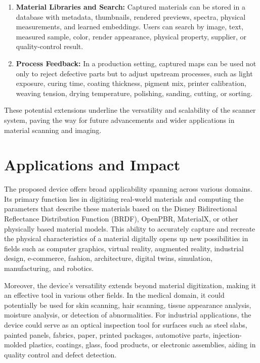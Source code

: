 \documentclass[11pt, twoside, listof=totocnumbered, bibliography=totocnumbered]{scrartcl}
\begin{document}
\begin{enumerate}
		\item \textbf{Material Libraries and Search:} Captured materials can be stored in a database with metadata, thumbnails, rendered previews, spectra, physical measurements, and learned embeddings. Users can search by image, text, measured sample, color, render appearance, physical property, supplier, or quality-control result.
		
		\item \textbf{Process Feedback:} In a production setting, captured maps can be used not only to reject defective parts but to adjust upstream processes, such as light exposure, curing time, coating thickness, pigment mix, printer calibration, weaving tension, drying temperature, polishing, sanding, cutting, or sorting.
	\end{enumerate}
	
	These potential extensions underline the versatility and scalability of the scanner system, paving the way for future advancements and wider applications in material scanning and imaging.
	
	\section{Applications and Impact}
	The proposed device offers broad applicability spanning across various domains. Its primary function lies in digitizing real-world materials and computing the parameters that describe these materials based on the Disney Bidirectional Reflectance Distribution Function (BRDF), OpenPBR, MaterialX, or other physically based material models. \cite{DISNEY_BRDF,OPENPBR,MATERIALX} This ability to accurately capture and recreate the physical characteristics of a material digitally opens up new possibilities in fields such as computer graphics, virtual reality, augmented reality, industrial design, e-commerce, fashion, architecture, digital twins, simulation, manufacturing, and robotics.
	
	Moreover, the device's versatility extends beyond material digitization, making it an effective tool in various other fields. In the medical domain, it could potentially be used for skin scanning, hair scanning, tissue appearance analysis, moisture analysis, or detection of abnormalities. For industrial applications, the device could serve as an optical inspection tool for surfaces such as steel slabs, painted panels, fabrics, paper, printed packages, automotive parts, injection-molded plastics, coatings, glass, food products, or electronic assemblies, aiding in quality control and defect detection.
	
\end{document}
